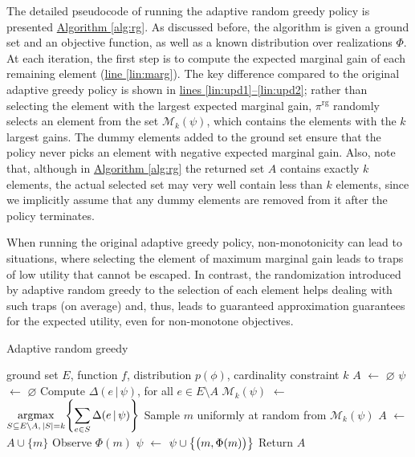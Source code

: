 \documentclass{article}
\newcommand{\algoref}[1]{\hyperref[#1]{Algorithm \ref*{#1}}}
\newcommand{\lineref}[1]{\hyperref[#1]{line \ref*{#1}}}
\newcommand{\linesref}[2]{\hyperref[#1]{lines \ref*{#1}--\ref*{#2}}}
\newcommand*\LET[2]{\STATE #1 $\gets$ #2}
\newcommand{\argmax}{\operatornamewithlimits{argmax}}
\let\originalleft\left
\let\originalright\right
\renewcommand{\left}{\mathopen{}\mathclose\bgroup\originalleft}
\renewcommand{\right}{\aftergroup\egroup\originalright}
\newcommand{\mmid}{\,\vert\,}
\newcommand{\D}[2]{\Delta(#1\mmid#2)}
\newcommand{\pig}{\pi^{\textrm{rg}}}
\newcommand{\Mk}{\mathcal{M}_k}
\begin{document}
The detailed pseudocode of running the adaptive random greedy policy is presented \algoref{alg:rg}.
As discussed before, the algorithm is given a ground set and an objective function, as well as a known distribution over realizations $\Phi$.
At each iteration, the first step is to compute the expected marginal gain of each remaining element (\lineref{lin:marg}).
The key difference compared to the original adaptive greedy policy is shown in \linesref{lin:upd1}{lin:upd2}; rather than selecting the element with the largest expected marginal gain, $\pig$ randomly selects an element from the set $\Mk(\psi)$, which contains the elements with the $k$ largest gains.
The dummy elements added to the ground set ensure that the policy never picks an element with negative expected marginal gain.
Also, note that, although in \algoref{alg:rg} the returned set $A$ contains exactly $k$ elements, the actual selected set may very well contain less than $k$ elements, since we implicitly assume that any dummy elements are removed from it after the policy terminates.

When running the original adaptive greedy policy, non-monotonicity can lead to situations, where selecting the element of maximum marginal gain leads to traps of low utility that cannot be escaped.
In contrast, the randomization introduced by adaptive random greedy to the selection of each element helps dealing with such traps (on average) and, thus, leads to guaranteed approximation guarantees for the expected utility, even for non-monotone objectives.

\begin{algorithm}[tb]
  \caption{Adaptive random greedy}
  \label{alg:rg}
  \small{
    \begin{algorithmic}[1]
      \REQUIRE ground set $E$, function $f$, distribution $p(\phi)$, cardinality constraint $k$
      \LET{$A$}{$\varnothing$}
      \LET{$\psi$}{$\varnothing$}
      \STATE Compute $\D{e}{\psi}$, for all $e \in E \setminus A$ \label{lin:marg}
      \LET{$\Mk(\psi)$}{$\displaystyle\argmax_{S \subseteq E \setminus A,\,|S| = k}\left\{\sum_{e \in S} \D{e}{\psi} \right\}$} \label{lin:upd1}
      \STATE Sample $m$ uniformly at random from $\Mk(\psi)$ \label{lin:upd2}
      \LET{$A$}{$A \cup \{m\}$}
      \STATE Observe $\Phi(m)$
      \LET{$\psi$}{$\psi \cup \left\{\big(m, \Phi(m)\big)\right\}$}
      \ENDFOR
      \STATE Return $A$
    \end{algorithmic}
  }
\end{algorithm}
\end{document}
